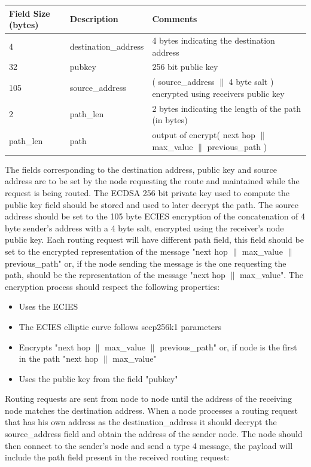 \begin{table}[H]
\begin{tabular}{|l|l|l|}
\hline
\rowcolor[HTML]{C0C0C0} 
Field Size (bytes)   & Description          & Comments \\ \hline
4 & destination\_address & 4 bytes indicating the destination address \\ \hline
32 & pubkey & 256 bit public key \\ \hline
105 & source\_address & ( source\_address $\|$ 4 byte salt ) encrypted using receivers public key \\ \hline
2 & path\_len & 2 bytes indicating the length of the path (in bytes) \\ \hline
path\_len & path & output of encrypt( next hop $\|$ max\_value $\|$ previous\_path ) \\ \hline
\end{tabular}
\end{table}

The fields corresponding to the destination address, public key and source address are to be set by the node requesting the route and maintained while the request is being routed. The ECDSA 256 bit private key used to compute the public key field should be stored and used to later decrypt the path. The source address should be set to the 105 byte ECIES encryption of the concatenation of 4 byte sender's address with a 4 byte salt, encrypted using the receiver's node public key.
Each routing request will have different path field, this field should be set to the encrypted representation of the message "next hop $\|$ max\_value $\|$ previous\_path" or, if the node sending the message is the one requesting the path, should be the representation of the message "next hop $\|$ max\_value". The encryption process should respect the following properties:

\begin{itemize}
  \item Uses the ECIES
  \item The ECIES elliptic curve follows secp256k1 parameters
  \item Encrypts "next hop $\|$ max\_value $\|$ previous\_path" or, if node is the first in the path "next hop $\|$ max\_value"
  \item Uses the public key from the field "pubkey"
\end{itemize}

Routing requests are sent from node to node until the address of the receiving node matches the destination address.
When a node processes a routing request that has his own address as the destination\_address it should decrypt the source\_address field and obtain the address of the sender node. The node should then connect to the sender's node and send a type 4 message, the payload will include the path field present in the received routing request:

